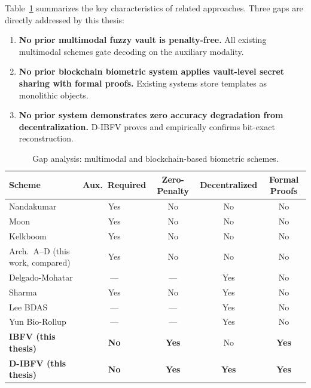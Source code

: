 Table~\ref{tab:gap} summarizes the key characteristics of related approaches.
Three gaps are directly addressed by this thesis:

\begin{enumerate}
  \item \textbf{No prior multimodal fuzzy vault is penalty-free.} All existing
  multimodal schemes gate decoding on the auxiliary modality.

  \item \textbf{No prior blockchain biometric system applies vault-level secret
  sharing with formal proofs.} Existing systems store templates as monolithic
  objects.

  \item \textbf{No prior system demonstrates zero accuracy degradation from
  decentralization.} D-IBFV proves and empirically confirms bit-exact reconstruction.
\end{enumerate}

\begin{table}[h]
\centering
\caption{Gap analysis: multimodal and blockchain-based biometric schemes.}
\label{tab:gap}
\small
\begin{tabular}{@{}lcccc@{}}
\toprule
\textbf{Scheme} & \textbf{Aux.\ Required} & \textbf{Zero-Penalty} &
\textbf{Decentralized} & \textbf{Formal Proofs} \\
\midrule
Nandakumar \cite{nandakumar2008multibiometric} & Yes & No & No & No \\
Moon \cite{moon2010multibiometric}             & Yes & No & No & No \\
Kelkboom \cite{kelkboom2011multialgorithm}     & Yes & No & No & No \\
Arch.\ A--D (this work, compared)             & Yes & No & No & No \\
\midrule
Delgado-Mohatar \cite{delgado2020blockchain}   & --- & --- & Yes & No \\
Sharma \cite{sharma2024multimodal}             & Yes & No & Yes & No \\
Lee BDAS \cite{lee2021securing}                & --- & --- & Yes & No \\
Yun Bio-Rollup \cite{yun2024biorollup}         & --- & --- & Yes & No \\
\midrule
\textbf{IBFV (this thesis)}   & \textbf{No} & \textbf{Yes} & No & \textbf{Yes} \\
\textbf{D-IBFV (this thesis)} & \textbf{No} & \textbf{Yes} & \textbf{Yes} & \textbf{Yes} \\
\bottomrule
\end{tabular}
\end{table}
